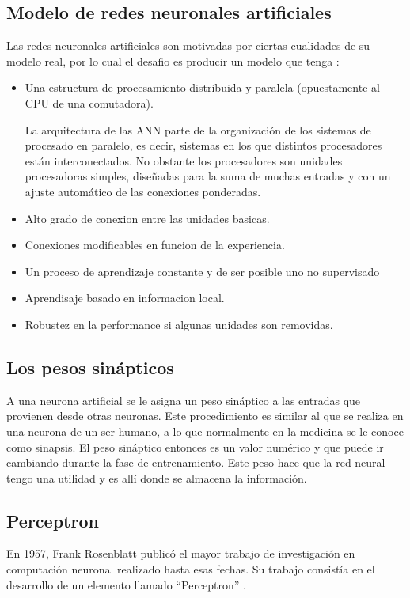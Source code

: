 \subsection{Modelo de redes neuronales artificiales}

Las redes neuronales artificiales son motivadas por ciertas cualidades de su modelo real, por lo cual el
desafio es producir un modelo que tenga \cite{nacelle2009redes}:
\begin{itemize}
\item  Una estructura de procesamiento distribuida y paralela (opuestamente al CPU de una comutadora).

La arquitectura de las ANN parte de la organización de los sistemas de procesado en paralelo, es decir, sistemas en los que distintos procesadores están interconectados. No
obstante los procesadores son unidades procesadoras simples, diseñadas para la suma de muchas entradas y con un ajuste automático de las conexiones ponderadas. 
\item Alto grado de conexion entre las unidades basicas.
\item Conexiones modificables en funcion de la experiencia.
\item Un proceso de aprendizaje constante y de ser posible uno no supervisado
\item Aprendisaje basado en informacion local.
\item Robustez en la performance si algunas unidades son removidas.

\end{itemize}

\subsection{Los pesos sinápticos}
A una neurona artificial se le asigna un peso sináptico a las entradas que provienen desde otras neuronas\cite{acevedo2017principios}. Este procedimiento es similar al que se realiza en una neurona de un ser humano, a lo que normalmente en la medicina se le conoce como sinapsis. El peso sináptico entonces es un valor numérico y que puede ir cambiando durante la fase de entrenamiento. Este peso hace que la red neural tengo una utilidad y es allí donde se almacena la información.

\subsection{Perceptron}
\vspace{1\baselineskip}
En 1957, Frank Rosenblatt publicó el mayor trabajo de investigación en computación neuronal realizado hasta esas fechas. Su trabajo consistía en el desarrollo de un
elemento llamado “Perceptron” \cite{olabe1998redes}.

